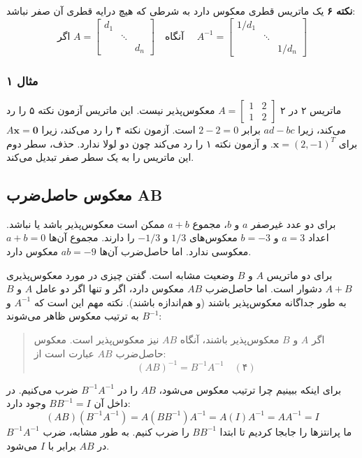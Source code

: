 \documentclass[12pt, a4paper]{book}
\begin{document}
	\textbf{نکته ۶}
	یک ماتریس قطری معکوس دارد به شرطی که هیچ درایه قطری آن صفر نباشد:
	\[
	\text{اگر } A = \begin{bmatrix} d_1 & & \\ & \ddots & \\ & & d_n \end{bmatrix} \quad \text{آنگاه } \quad A^{-1} = \begin{bmatrix} 1/d_1 & & \\ & \ddots & \\ & & 1/d_n \end{bmatrix}
	\]
	
	\subsubsection*{مثال ۱}
	ماتریس ۲ در ۲ $A=\begin{bmatrix} 1 & 2 \\ 1 & 2 \end{bmatrix}$ معکوس‌پذیر نیست. این ماتریس آزمون نکته ۵ را رد می‌کند، زیرا $ad-bc$ برابر $2-2=0$ است. آزمون نکته ۴ را رد می‌کند، زیرا $A\mathbf{x}=\mathbf{0}$ برای $\mathbf{x}=(2, -1)^T$. و آزمون نکته ۱ را رد می‌کند چون دو لولا ندارد. حذف، سطر دوم این ماتریس را به یک سطر صفر تبدیل می‌کند.
	
	\subsection*{معکوس حاصل‌ضرب AB}
	برای دو عدد غیرصفر $a$ و $b$، مجموع $a+b$ ممکن است معکوس‌پذیر باشد یا نباشد. اعداد $a=3$ و $b=-3$ معکوس‌های $1/3$ و $-1/3$ را دارند. مجموع آن‌ها $a+b=0$ معکوسی ندارد. اما حاصل‌ضرب آن‌ها $ab=-9$ معکوس دارد.
	
	برای دو ماتریس $A$ و $B$ وضعیت مشابه است. گفتن چیزی در مورد معکوس‌پذیری $A+B$ دشوار است. اما حاصل‌ضرب $AB$ معکوس دارد، اگر و تنها اگر دو عامل $A$ و $B$ به طور جداگانه معکوس‌پذیر باشند (و هم‌اندازه باشند). نکته مهم این است که $A^{-1}$ و $B^{-1}$ به ترتیب معکوس ظاهر می‌شوند:
	\begin{quote}
		اگر $A$ و $B$ معکوس‌پذیر باشند، آنگاه $AB$ نیز معکوس‌پذیر است. معکوس حاصل‌ضرب $AB$ عبارت است از:
		\[ (AB)^{-1} = B^{-1}A^{-1} \quad (۴) \]
	\end{quote}
	برای اینکه ببینیم چرا ترتیب معکوس می‌شود، $AB$ را در $B^{-1}A^{-1}$ ضرب می‌کنیم. در داخل آن $BB^{-1}=I$ وجود دارد:
	\[ (AB)(B^{-1}A^{-1}) = A(BB^{-1})A^{-1} = A(I)A^{-1} = AA^{-1} = I \]
	ما پرانتزها را جابجا کردیم تا ابتدا $BB^{-1}$ را ضرب کنیم. به طور مشابه، ضرب $B^{-1}A^{-1}$ در $AB$ برابر با $I$ می‌شود.
	
\end{document}
